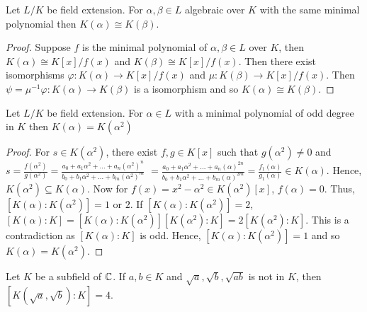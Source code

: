 \begin{exercise}{}{}
    Let $L/K$ be field extension.
    For $\alpha,\beta\in L$ algebraic over $K$ with the same minimal polynomial then $K(\alpha)\cong K(\beta)$.
\end{exercise}

\begin{proof}
    Suppose $f$ is the minimal polynomial of $\alpha,\beta\in L$ over $K$, then $K(\alpha)\cong K[x]/f(x)$ and $K(\beta)\cong K[x]/f(x)$.
    Then there exist isomorphisms $\varphi: K(\alpha)\rightarrow K[x]/f(x)$ and $\mu: K(\beta)\rightarrow K[x]/f(x)$. 
    Then $\psi=\mu^{-1}\varphi:K(\alpha)\rightarrow K(\beta)$ is a isomorphism and so $K(\alpha)\cong K(\beta)$.
\end{proof}



\begin{exercise}{}{}
    Let $L/K$ be field extension. For $\alpha\in L$ with a minimal polynomial of odd degree in $K$ then $K(\alpha)=K(\alpha^2)$
\end{exercise}


\begin{proof}
    For $s\in K(\alpha^2)$, there exist $f,g\in K[x]$ such that $g(\alpha^2)\neq 0$ and 
    $s=\frac{f(\alpha^2)}{g(\alpha^2)}=\frac{a_0+a_1\alpha^2+...+a_n(\alpha^2)^n}{b_0+b_1\alpha^2+...+b_m(\alpha^2)^m}$
    $=\frac{a_0+a_1\alpha^2+...+a_n(\alpha)^{2n}}{b_0+b_1\alpha^2+...+b_m(\alpha)^{2m}}=\frac{f_1(\alpha)}{g_1(\alpha)}\in K(\alpha)$. 
    Hence, $K(\alpha^2)\subseteq K(\alpha)$. 
    Now for $f(x)=x^2-\alpha^2\in K(\alpha^2)[x]$, $f(\alpha)=0$. 
    Thus, $[K(\alpha):K(\alpha^2)]=1$ or $2$.
    If $[K(\alpha):K(\alpha^2)]=2$, $[K(\alpha):K]=[K(\alpha):K(\alpha^2)][K(\alpha^2):K]=2[K(\alpha^2):K]$.
    This is a contradiction as $[K(\alpha):K]$ is odd.
    Hence, $[K(\alpha):K(\alpha^2)]=1$ and so $K(\alpha)=K(\alpha^2)$.
\end{proof}


\begin{exercise}{}{}
    Let $K$ be a subfield of $\mathbb{C}$. If $a,b\in K$ and $\sqrt{a},\sqrt{b},\sqrt{ab}$ is not in $K$,
    then $[K(\sqrt{a},\sqrt{b}):K]=4$.
\end{exercise}

